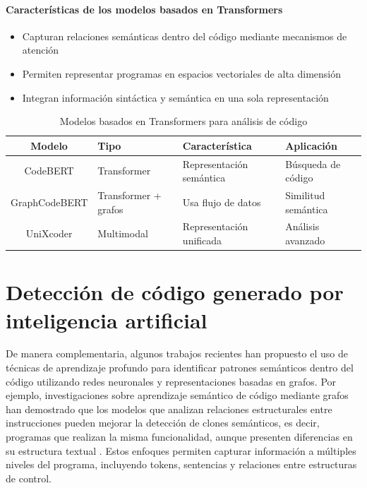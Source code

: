 \paragraph{Características de los modelos basados en Transformers}
\begin{itemize}
    \item Capturan relaciones semánticas dentro del código mediante mecanismos de atención
    \item Permiten representar programas en espacios vectoriales de alta dimensión
    \item Integran información sintáctica y semántica en una sola representación
\end{itemize}

\begin{table}[H]
\centering
\begin{tabularx}{\textwidth}{|c|>{\centering\arraybackslash}X|>{\centering\arraybackslash}X|>{\centering\arraybackslash}X|}
\hline
\textbf{Modelo} & \textbf{Tipo} & \textbf{Característica} & \textbf{Aplicación} \\ \hline
CodeBERT & Transformer & Representación semántica & Búsqueda de código \\ \hline
GraphCodeBERT & Transformer + grafos & Usa flujo de datos & Similitud semántica \\ \hline
UniXcoder & Multimodal & Representación unificada & Análisis avanzado \\ \hline
\end{tabularx}
\caption{Modelos basados en Transformers para análisis de código}
\end{table}

\section{Detección de código generado por inteligencia artificial}

De manera complementaria, algunos trabajos recientes han propuesto el uso de técnicas de aprendizaje profundo para identificar patrones semánticos dentro del código utilizando redes neuronales y representaciones basadas en grafos. Por ejemplo, investigaciones sobre aprendizaje semántico de código mediante grafos han demostrado que los modelos que analizan relaciones estructurales entre instrucciones pueden mejorar la detección de clones semánticos, es decir, programas que realizan la misma funcionalidad, aunque presenten diferencias en su estructura textual \cite{Yu2023Graph}. Estos enfoques permiten capturar información a múltiples niveles del programa, incluyendo tokens, sentencias y relaciones entre estructuras de control.

